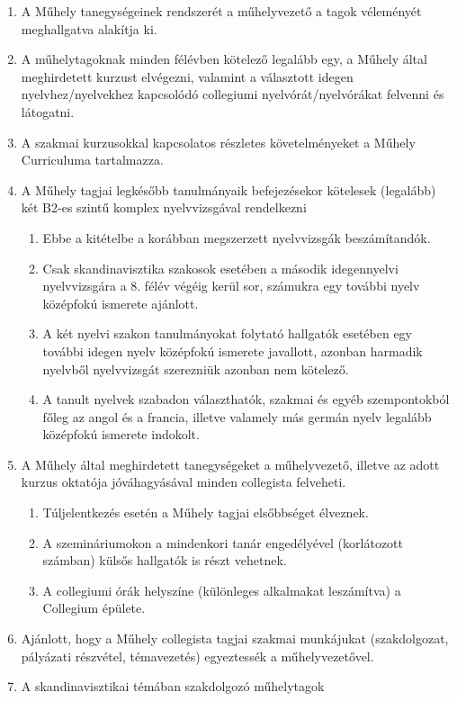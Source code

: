 \documentclass{../styles/rulebook}
\begin{document}
\begin{enumerate}
	\item A Műhely tanegységeinek rendszerét a műhelyvezető a tagok véleményét meghallgatva alakítja ki. 
	\item A műhelytagoknak minden félévben kötelező legalább egy, a Műhely által meghirdetett kurzust elvégezni, valamint a választott idegen nyelvhez/nyelvekhez kapcsolódó collegiumi
	nyelvórát/nyelvórákat felvenni és látogatni.
	\item A szakmai kurzusokkal kapcsolatos
	részletes követelményeket a Műhely Curriculuma tartalmazza.
	\item A Műhely tagjai legkésőbb tanulmányaik befejezésekor
	kötelesek (legalább) két B2-es szintű komplex nyelvvizsgával
	rendelkezni 
	\begin{enumerate}
		\item Ebbe a kitételbe a korábban megszerzett nyelvvizsgák beszámítandók. 
		\item Csak skandinavisztika szakosok esetében a második idegennyelvi nyelvvizsgára a 8.
		félév végéig kerül sor, számukra egy további nyelv középfokú ismerete ajánlott.
		\item A két nyelvi szakon tanulmányokat folytató hallgatók esetében egy további
		idegen nyelv középfokú ismerete javallott, azonban harmadik nyelvből nyelvvizsgát
		szerezniük azonban nem kötelező. 
		\item A tanult nyelvek szabadon választhatók, szakmai és egyéb szempontokból főleg az angol és a francia, illetve valamely más germán nyelv legalább középfokú ismerete indokolt.
	\end{enumerate}
	\item A Műhely által meghirdetett tanegységeket a műhelyvezető, illetve az adott kurzus oktatója jóváhagyásával minden collegista felveheti.
	\begin{enumerate}
		\item Túljelentkezés esetén a Műhely tagjai elsőbbséget élveznek. 
		\item A szemináriumokon a mindenkori tanár engedélyével (korlátozott számban) külsős	hallgatók is részt vehetnek. 
		\item A collegiumi órák helyszíne (különleges alkalmakat leszámítva) a Collegium épülete.
	\end{enumerate}	
	\item Ajánlott, hogy a Műhely collegista tagjai szakmai munkájukat (szakdolgozat, pályázati részvétel, témavezetés) egyeztessék a
	műhelyvezetővel.
	\item A skandinavisztikai témában szakdolgozó műhelytagok

\end{enumerate}
\end{document}

